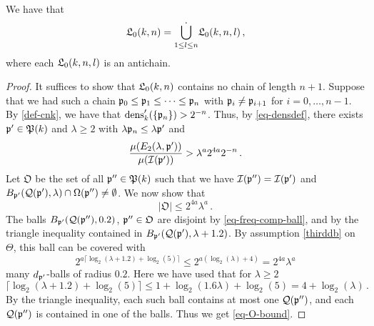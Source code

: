 \begin{lemma}[L0 antichain]
\label{L0-antichain}
\leanok
{}
    We have that
    $$
        {\mathfrak L}_0(k,n) = \dot{\bigcup_{1 \le l \le n}} {\mathfrak L}_0(k,n,l)\,,
    $$
    where each ${\mathfrak L}_0(k,n,l)$ is an antichain.
\end{lemma}

\begin{proof}
    \leanok
    It suffices to show that ${\mathfrak L}_0(k,n)$ contains no chain of length $n + 1$. Suppose that we had such a chain ${\mathfrak p}_0 \le {\mathfrak p}_1 \le \dotsb \le {\mathfrak p}_{n}$ with ${\mathfrak p}_i \ne {\mathfrak p}_{i+1}$ for $i =0, \dotsc, n-1$. By \eqref{def-cnk}, we have that $\operatorname{\operatorname{dens}}_k'(\{{\mathfrak p}_n\}) > 2^{-n}$. Thus, by \eqref{eq-densdef}, there exists ${\mathfrak p}' \in {\mathfrak P}(k)$ and $\lambda \ge 2$ with $\lambda {\mathfrak p}_n \le \lambda {\mathfrak p}'$ and
    \begin{equation}
        \label{eq-p'}
        \frac{\mu(E_2(\lambda, {\mathfrak p}'))}{\mu({\mathcal{I}}({\mathfrak p}'))} > \lambda^{a} 2^{4a} 2^{-n}\,.
    \end{equation}
    Let $\mathfrak{O}$ be the set of all ${\mathfrak p}'' \in {\mathfrak P}(k)$ such that we have $ {\mathcal{I}}({\mathfrak p}'') = {\mathcal{I}}({\mathfrak p}')$ and $B_{{\mathfrak p}'}({\mathcal{Q}}({\mathfrak p}'), \lambda) \cap \Omega({\mathfrak p}'') \neq \emptyset$.
    We now show that
    \begin{equation}
        \label{eq-O-bound}
        |\mathfrak{O}| \le 2^{4a}\lambda^a\,.
    \end{equation}
    The balls $B_{{\mathfrak p}'}({\mathcal{Q}}({\mathfrak p}''), 0.2)$, ${\mathfrak p}'' \in \mathfrak{O}$ are disjoint by \eqref{eq-freq-comp-ball},
    and by the triangle inequality contained in $B_{{\mathfrak p}'}({\mathcal{Q}}({\mathfrak p}'), \lambda+1.2)$.
    By assumption \eqref{thirddb} on $\Theta$, this ball can be covered with
    $$
        2^{a\lceil \log_2(\lambda+1.2) + \log_2(5)\rceil} \le 2^{a(\log_2(\lambda) + 4)} = 2^{4a}\lambda^a
    $$
    many $d_{{\mathfrak p}'}$-balls of radius $0.2$. Here we have used that for $\lambda \ge 2$
    $$
        \lceil \log_2(\lambda + 1.2)  + \log_2(5) \rceil \le 1+ \log_2(1.6  \lambda) + \log_2(5) = 4 + \log_2(\lambda)\,.
    $$
    By the triangle inequality, each such ball contains at most one ${\mathcal{Q}}({\mathfrak p}'')$, and each ${\mathcal{Q}}({\mathfrak p}'')$ is contained in one of the balls. Thus we get \eqref{eq-O-bound}.


\end{proof}

